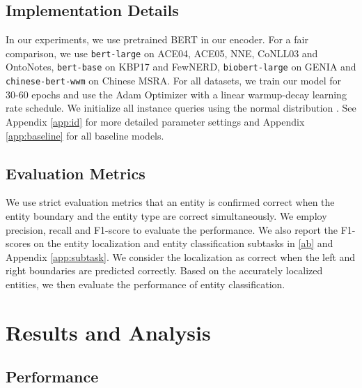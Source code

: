 \documentclass[11pt]{article}
\begin{document}
\subsection{Implementation Details}

In our experiments, we use pretrained BERT \citep{devlin-etal-2019-bert} in our encoder. For a fair comparison, we use \texttt{bert-large} on ACE04, ACE05, NNE, CoNLL03 and OntoNotes, \texttt{bert-base} on KBP17 and FewNERD, \texttt{biobert-large} \citep{chiu-etal-2016-train} on GENIA and \texttt{chinese-bert-wwm} \citep{cui-etal-2020-revisiting} on Chinese MSRA. For all datasets, we train our model for 30-60 epochs and use the Adam Optimizer \citep{adam} with a linear warmup-decay learning rate schedule.
We initialize all instance queries using the normal distribution . See Appendix \ref{app:id} for more detailed parameter settings and Appendix \ref{app:baseline} for all baseline models.


\subsection{Evaluation Metrics}



We use strict evaluation metrics that an entity is confirmed correct when the entity boundary and the entity type are correct simultaneously. We employ precision, recall and F1-score to evaluate the performance. We also report the F1-scores on the entity localization and entity classification subtasks in \cref{ab} and Appendix \ref{app:subtask}. We consider the localization as correct when the left and right boundaries are predicted correctly. Based on the accurately localized entities, we then evaluate the performance of entity classification.





\section{Results and Analysis}

\subsection{Performance}
\end{document}
